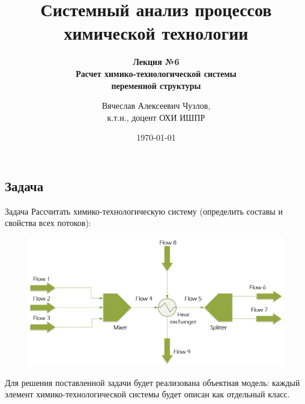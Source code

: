\documentclass[aspectratio=169, mathserif]{beamer}%
\title{\LARGE{Системный анализ процессов химической технологии}}
\subtitle{\textcolor{tpugreen}{\textbf{Лекция №6}} \\ \textbf{Расчет химико-технологической системы \\ переменной структуры}}
\author[]{Вячеслав Алексеевич Чузлов, \\
к.т.н., доцент ОХИ ИШПР}
\date{\today}
\begin{document}
\newcommand{\pythoninline}[1]{%
	\colorbox{white}{%
		\parbox[b][.6em]{\widthof{\texttt{#1}}}{\texttt{#1}}%
	}%
}


\titleframe%



\subsection{Задача}
\begin{frame}[fragile]{Задача}
\scriptsize
Рассчитать химико-технологическую систему (определить составы и свойства всех потоков):
\vfill
\begin{figure}[h!]
\includegraphics[width=.8\textwidth]{./pics/pfd}
\end{figure}
\vfill
Для решения поставленной задачи будет реализована объектная модель: каждый элемент химико-технологической системы будет описан как отдельный класс.
\vfill
\end{frame}
\end{document}
